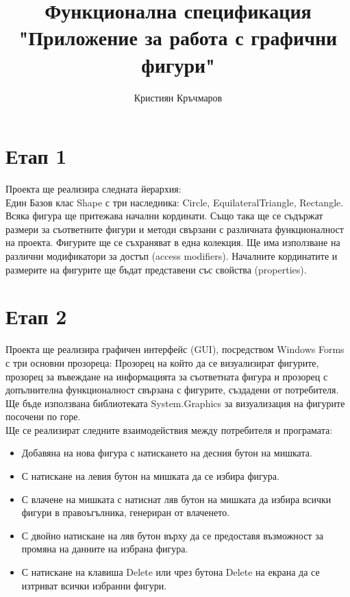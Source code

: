 \documentclass[a4paper,fleqn,12pt]{article}
\title{
  Функционална спецификация \\
  \large "Приложение за работа с графични фигури"}
\author{Кристиян Кръчмаров}
\begin{document}
\maketitle

\newpage
{}

\section{Етап 1}
Проекта ще реализира следната йерархия: \\
Един Базов клас Shape с три наследника: Circle, EquilateralTriangle, Rectangle. 
Всяка фигура ще притежава начални кординати.
Също така ще се съдържат размери за съответните фигури и методи свързани с различната функционалност на проекта. 
Фигурите ще се съхраняват в една колекция.
Ще има използване на различни модификатори за достъп (access modifiers).
Началните кординатите и размерите на фигурите ще бъдат представени със свойства (properties).

\section{Етап 2}
Проекта ще реализира графичен интерфейс (GUI), посредством Windows Forms с три основни прозореца: Прозорец на който да се визуализират фигурите, прозорец за въвеждане на информацията за съответната фигура и прозорец с допълнителна функционалност свързана с фигурите, създадени от потребителя. 
Ще бъде използвана библиотеката System.Graphics за визуализация на фигурите посочени по горе. \\
Ще се реализират следните взаимодействия между потребителя и програмата: 
\begin{itemize}
\item Добавяна на нова фигура с натискането на десния бутон на мишката. 
\item С натискане на левия бутон на мишката да се избира фигура.
\item С влачене на мишката с натиснат ляв бутон на мишката да избира всички фигури в правоъгълника, генериран от влаченето. 
\item С двойно натискане на ляв бутон върху да се предоставя възможност за промяна на данните на избрана фигура.
\item С натискане на клавиша Delete или чрез бутона Delete на екрана да се изтриват всички избранни фигури. 
\end{itemize}
\end{document}
